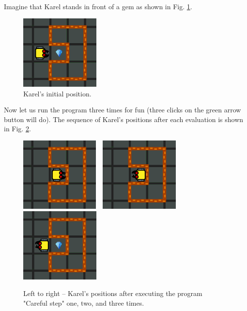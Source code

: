 \noindent
Imagine that Karel stands in front of a gem as shown in Fig. \ref{fig:if-111}.
\newpage

\begin{figure}[!ht]
\begin{center}
\includegraphics[width=4cm]{img/if-111.png}
\vspace{-0mm}
\caption{Karel's initial position.}
\label{fig:if-111}
\end{center}
\end{figure}
\noindent
Now let us run the program three times for fun (three clicks on the green arrow button 
will do). The sequence of Karel's positions after each evaluation is shown in 
Fig. \ref{fig:if-112}.

\begin{figure}[!ht]
\begin{center}
\includegraphics[width=3.97cm]{img/if-112.png}\ \ 
\includegraphics[width=4cm]{img/if-113.png}\ \ 
\includegraphics[width=4cm]{img/if-114.png}
\vspace{-0mm}
\caption{Left to right -- Karel's positions after executing the program "Careful step" one, two, and three times.}
\label{fig:if-112}
\vspace{-4mm}
\end{center}
\end{figure}
\noindent

